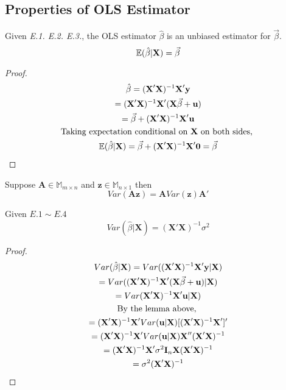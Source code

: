 \documentclass[]{article}
\begin{document}
    	\subsection{Properties of OLS Estimator}
    	\begin{theorem}
    		Given \emph{E.1. E.2. E.3.}, the OLS estimator $\hat{\beta}$ is an unbiased estimator for $\vec{\beta}$.
    		\[
    			\mathbb{E}({\hat{\beta}|\textbf{X}}) = \vec{\beta}
    		\]
    	\end{theorem}
    	\begin{proof}
    		\begin{gather*}
    			\hat{\beta} = (\textbf{X}'\textbf{X})^{-1} \textbf{X}' \textbf{y} \\
    			= (\textbf{X}'\textbf{X})^{-1} \textbf{X}' (\textbf{X}\vec{\beta} + \textbf{u}) \\
    			= \vec{\beta} + (\textbf{X}'\textbf{X})^{-1} \textbf{X}' \textbf{u} \\
    			\text{{Taking expectation conditional on \textbf{X} on both sides, }}\\
    			\mathbb{E}({\hat{\beta}|\textbf{X}}) = \vec{\beta} + (\textbf{X}'\textbf{X})^{-1} \textbf{X}' \textbf{0} 
    			= \vec{\beta}
    		\end{gather*}
    	\end{proof}
    	
    	\begin{lemma}
    		Suppose $\textbf{A} \in \mathbb{M}_{m\times n}$ and $\textbf{z} \in \mathbb{M}_{n\times 1}$ then 
    		\[
    			Var(\textbf{A} \textbf{z}) = \textbf{A} Var(\textbf{z}) \textbf{A}'
    		\]
    	\end{lemma}
    	\begin{theorem}
    		Given $E.1 \sim E.4$
    		\[
    			Var(\hat{\beta}|\textbf{X}) = (\textbf{X}' \textbf{X})^{-1} \sigma^2
    		\]
    	\end{theorem}
    	\begin{proof}
    		\begin{gather*}
    			Var(\hat{\beta}|\textbf{X}) = Var((\textbf{X}'\textbf{X})^{-1} \textbf{X}' \textbf{y} | \textbf{X}) \\ 
    			= Var((\textbf{X}'\textbf{X})^{-1} \textbf{X}'(\textbf{X}\vec{\beta} + \textbf{u})|\textbf{X}) \\
    			= Var(\textbf{X}'\textbf{X})^{-1} \textbf{X}'\textbf{u}|\textbf{X}) \\
    			\text{{By the lemma above, }} \\
    			= (\textbf{X}'\textbf{X})^{-1} \textbf{X}' Var(\textbf{u}|\textbf{X}) [(\textbf{X}'\textbf{X})^{-1} \textbf{X}']' \\
    			= (\textbf{X}'\textbf{X})^{-1} \textbf{X}' Var(\textbf{u}|\textbf{X}) \textbf{X}'' (\textbf{X}'\textbf{X})^{-1} \\
    			= (\textbf{X}'\textbf{X})^{-1} \textbf{X}' \sigma^2 \textbf{I}_n \textbf{X} (\textbf{X}'\textbf{X})^{-1} \\
    			= \sigma^2 (\textbf{X}'\textbf{X})^{-1}
    		\end{gather*}
    	\end{proof}
    	
\end{document}
